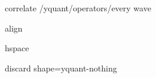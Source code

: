 \yquant@langhelper@declare@command@uncontrolled%
   {correlate}%
   {%
      \yquant@register@get@allowmultitrue%
      \let\yquant@register@multi@splitparts=\yquant@register@multi@splitparts@sepall%
   }{%
      \yquant@prepare%
         {}%
         {/yquant/operators/every wave}%
   }

\yquant@langhelper@declare@command@uncontrolled%
   {align}%
   {}%
   {%
      \yquant@circuit@align\yquant@circuit@operator@targets%
   }

\yquant@langhelper@declare@command@uncontrolled%
   {hspace}%
   {%
      \yquant@langhelper@validate\amount\dimen\yquant@lang@attr@value%
   }{%
      \yquant@circuit@hspace\yquant@circuit@operator@targets\amount%
   }

\yquant@langhelper@declare@command%
   {discard}%
   {}%
   {%
      \let\yquant@circuit@settype@to=\yquant@register@type@none%
      \ifyquant@circuit@operator@hasControls%
         \epreto{}%
         \let\yquant@prepare@callback@prepare=\yquant@circuit@settype@prepare%
         \let\yquant@prepare@callback@draw=\yquant@circuit@settype@beforenobit%
         \yquant@prepare%
            {}%
            {shape=yquant-nothing}%
      \else%
         \yquant@circuit@actonwires%
            \yquant@circuit@settype@prepare%
            \yquant@circuit@settype%
            \yquant@circuit@operator@targets%
            {}%
      \fi%
   }

